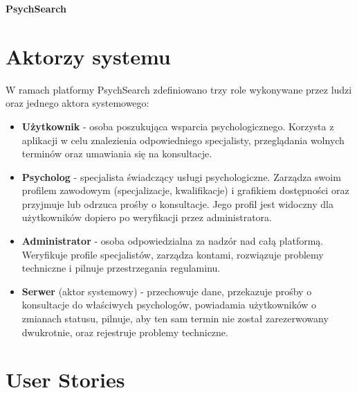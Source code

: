 \documentclass[11pt,a4paper]{article}
\begin{document}
\begin{center}
{\LARGE \textbf{PsychSearch}}
\end{center}

\vspace{0.5cm}

\section*{Aktorzy systemu}
 
W ramach platformy PsychSearch zdefiniowano
trzy role wykonywane przez ludzi oraz jednego
aktora systemowego:
 
\begin{itemize}
 
\item \textbf{Użytkownik} -
osoba poszukująca wsparcia psychologicznego.
Korzysta z aplikacji w celu znalezienia
odpowiedniego specjalisty, przeglądania
wolnych terminów oraz umawiania się
na konsultacje.
 
\item \textbf{Psycholog} -
specjalista świadczący usługi psychologiczne.
Zarządza swoim profilem zawodowym
(specjalizacje, kwalifikacje) i grafikiem
dostępności oraz przyjmuje lub odrzuca prośby
o konsultacje. Jego profil jest widoczny
dla użytkowników dopiero po weryfikacji
przez administratora.
 
\item \textbf{Administrator} -
osoba odpowiedzialna za nadzór nad całą
platformą. Weryfikuje profile specjalistów,
zarządza kontami, rozwiązuje problemy
techniczne i pilnuje przestrzegania regulaminu.
 
\item \textbf{Serwer} (aktor systemowy) -
przechowuje dane, przekazuje prośby
o konsultacje do właściwych psychologów,
powiadamia użytkowników o zmianach statusu,
pilnuje, aby ten sam termin nie został
zarezerwowany dwukrotnie, oraz rejestruje
problemy techniczne.
 
\end{itemize}
 
\vspace{0.5cm}
 
\section*{User Stories}
 
\end{document}
